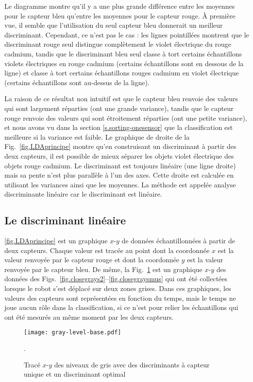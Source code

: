 Le diagramme montre qu'il y a une plus grande différence entre les moyennes pour le capteur bleu qu'entre les moyennes pour le capteur rouge. À première vue, il semble que l'utilisation du seul capteur bleu donnerait un meilleur discriminant. Cependant, ce n'est pas le cas : les lignes pointillées montrent que le discriminant rouge seul distingue complètement le violet électrique du rouge cadmium, tandis que le discriminant bleu seul classe à tort certains échantillons violets électriques en rouge cadmium (certains échantillons sont en dessous de la ligne) et classe à tort certains échantillons rouges cadmium en violet électrique (certains échantillons sont au-dessus de la ligne).

La raison de ce résultat non intuitif est que le capteur bleu renvoie des valeurs qui sont largement réparties (ont une grande variance), tandis que le capteur rouge renvoie des valeurs qui sont étroitement réparties (ont une petite variance), et nous avons vu dans la section \ref{s.sorting-onesensor} que la classification est meilleure si la variance est faible. Le graphique de droite de la Fig.~\ref{fig.LDAprincipe} montre qu'en construisant un discriminant à partir des deux capteurs, il est possible de mieux séparer les objets violet électrique des objets rouge cadmium. Le discriminant est toujours linéaire (une ligne droite) mais sa pente n'est plus parallèle à l'un des axes. Cette droite est calculée en utilisant les variances ainsi que les moyennes. La méthode est appelée analyse discriminante linéaire car le discriminant est linéaire.


\subsection{Le discriminant linéaire}
\ref{fig.LDAprincipe} est un graphique $x$-$y$ de données échantillonnées à partir de deux capteurs. Chaque valeur est tracée au point dont la coordonnée $x$ est la valeur renvoyée par le capteur rouge et dont la coordonnée $y$ est la valeur renvoyée par le capteur bleu. De même, la Fig.~\ref{fig.gray-x-y} est un graphique $x$-$y$ des données des Figs.~\ref{fig.closegrays2}--\ref{fig.closegraysmus} qui ont été collectées lorsque le robot s'est déplacé sur deux zones grises.  Dans ces graphiques, les valeurs des capteurs sont représentées en fonction du temps, mais le temps ne joue aucun rôle dans la classification, si ce n'est pour relier les échantillons qui ont été mesurés au même moment par les deux capteurs.

\begin{figure}
\begin{center}
\texttt{[image: gray-level-base.pdf]}
\end{center}
\caption{Tracé $x$-$y$ des niveaux de gris avec des discriminants à capteur unique et un discriminant optimal}
\label{fig.gray-x-y}.
\end{figure}

